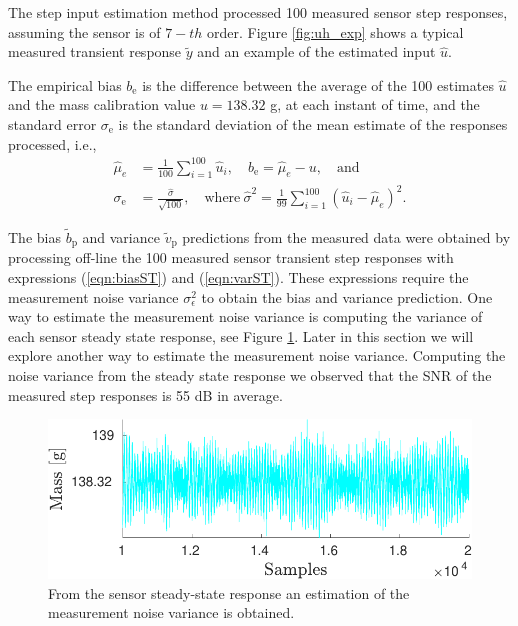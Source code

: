 The step input estimation method processed 100 measured sensor step responses, assuming the sensor is of $\mathrm{7-}th$ order.
Figure \ref{fig:uh_exp} shows a typical measured transient response $\widetilde{y}$ and an example of the estimated input $\widehat{u}$.

The empirical bias $b_{\mathrm{e}}$ is the difference between the average of the 100 estimates $\widehat{u}$ and the mass calibration value $u = 138.32$ g, at each instant of time, and the standard error $\sigma_\mathrm{e}$ is the standard deviation of the mean estimate of the responses processed, i.e.,
\begin{equation} \begin{aligned} \widehat{\mu}_{e} &= \frac{1}{100} \sum_{i=1}^{100}{ \widehat{u}_{i} }, \quad {b}_{\mathrm{e}} = \widehat{\mu}_{e} - u, \quad \mathrm{and} \\  \sigma_{\mathrm{e}} &= \frac{\widehat{\sigma}}{\sqrt{100}}, \quad \mathrm{where} \ \widehat{\sigma}^2 = \frac{1}{99} \sum_{i=1}^{100}{ \left( \widehat{u}_i - \widehat{\mu}_{e} \right)^2 } . \end{aligned} \end{equation}


The bias $\widetilde{b}_{\mathrm{p}}$ and variance $\widetilde{v}_{\mathrm{p}}$ predictions from the measured data were obtained by processing off-line the 100 measured sensor transient step responses with expressions (\ref{eqn:biasST}) and (\ref{eqn:varST}).
These expressions require the measurement noise variance $\sigma_\epsilon^2$ to obtain the bias and variance prediction.
One way to estimate the measurement noise variance is computing the variance of each sensor steady state response, see Figure \ref{fig:y_ss}.
Later in this section we will explore another way to estimate the measurement noise variance.
Computing the noise variance from the steady state response we observed that the SNR of the measured step responses is 55 dB in average.

\begin{figure}[!htb]
\centering
\includegraphics[width=1.0\columnwidth]{./ChapterExperimentalValidation/fig/Fig_7.pdf}
\caption{ \label{fig:y_ss} 
From the sensor steady-state response an estimation of the measurement noise variance is obtained.}
\end{figure}

